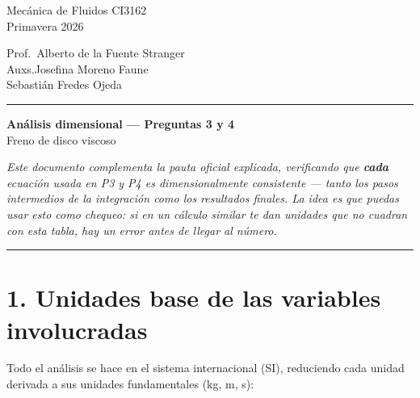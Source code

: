 \documentclass[11pt]{article}
\begin{document}
\shorthandoff{<>}

\noindent
\begin{minipage}[t]{0.45\textwidth}
\raggedright
Mec\'anica de Fluidos CI3162\\
Primavera 2026
\end{minipage}%
\hfill
\begin{minipage}[t]{0.45\textwidth}
\raggedleft
Prof.\ Alberto de la Fuente Stranger\\
Auxs.\hspace{0.6cm}Josefina Moreno Faune\\
Sebasti\'an Fredes Ojeda
\end{minipage}

\vspace{3pt}
\hrule
\vspace{-5pt}

\begin{center}
{\Huge\bfseries An\'alisis dimensional --- Preguntas 3 y 4}\\[6pt]
{\large Freno de disco viscoso}
\end{center}

\vspace{10pt}
\noindent\textit{Este documento complementa la pauta oficial explicada, verificando
que \textbf{cada} ecuaci\'on usada en P3 y P4 es dimensionalmente consistente ---
tanto los pasos intermedios de la integraci\'on como los resultados finales. La idea
es que puedas usar esto como chequeo: si en un c\'alculo similar te dan unidades que
no cuadran con esta tabla, hay un error antes de llegar al n\'umero.}
\vspace{4pt}
\hrule

\section*{1. Unidades base de las variables involucradas}

Todo el an\'alisis se hace en el sistema internacional (SI), reduciendo cada unidad
derivada a sus unidades fundamentales (kg, m, s):
\end{document}
